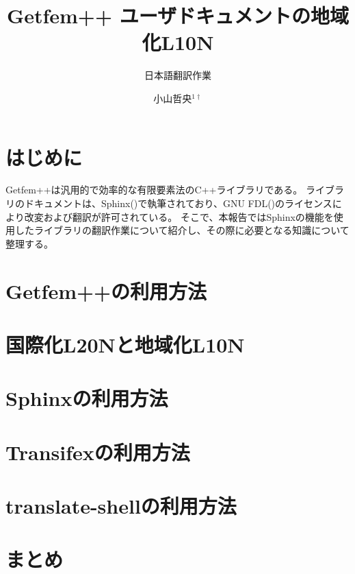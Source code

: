 \documentclass{../../style/ltjoc}
\title{Getfem++ ユーザドキュメントの地域化L10N}
\subtitle{日本語翻訳作業}
\author{%
小山哲央$^{1\dagger}$%
}
\affiliation{%
${}^{1}$株式会社アーク情報システム%
}
\begin{document}
\maketitle
\section{はじめに}
Getfem++は汎用的で効率的な有限要素法のC++ライブラリである。
ライブラリのドキュメントは、Sphinx()で執筆されており、GNU FDL()のライセンスにより改変および翻訳が許可されている。
そこで、本報告ではSphinxの機能を使用したライブラリの翻訳作業について紹介し、その際に必要となる知識について整理する。
\section{Getfem++の利用方法}
\section{国際化L20Nと地域化L10N}
\section{Sphinxの利用方法}
\section{Transifexの利用方法}
\section{translate-shellの利用方法}
\section{まとめ}
\end{document}
